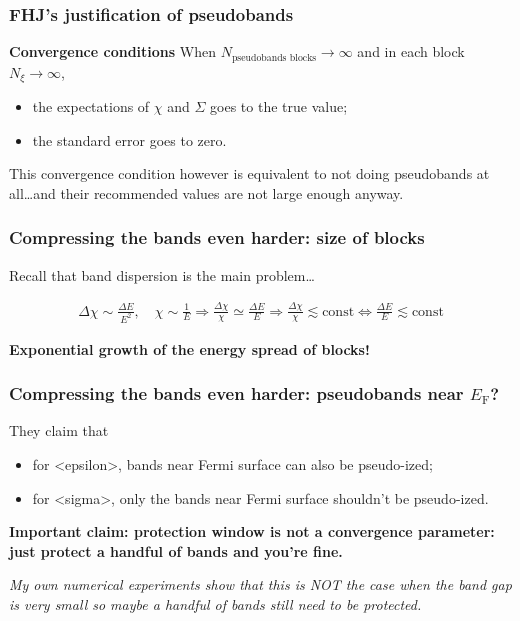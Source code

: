 \documentclass[t,aspectratio=169]{beamer}
\newcommand{\shortcode}[1]{\texttt{#1}}
\newcommand*{\const}{\text{const}}
\def\\{}%
\def\texttt#1{<#1>}%
\begin{document}
\begin{frame}
\frametitle{FHJ's justification of pseudobands}

\textbf{Convergence conditions} When $N_{\text{pseudobands blocks}} \to \infty$ and in each block $N_\xi \to \infty$, 
\begin{itemize}
    \item the expectations of $\chi$ and $\Sigma$ goes to the true value;
    \item the standard error goes to zero.
\end{itemize}

This convergence condition however is equivalent to not doing pseudobands at all\dots and their recommended values are not large enough anyway.


\end{frame}

\begin{frame}
\frametitle{Compressing the bands even harder: size of blocks}

Recall that band dispersion is the main problem\dots

\[
    \begin{aligned}
        \Delta \chi \sim \frac{\Delta E}{E^2}, \quad \chi \sim \frac{1}{E} \Rightarrow
        \frac{\Delta \chi}{\chi} \simeq \frac{\Delta E}{E} \\
        \Rightarrow
        \frac{\Delta \chi}{\chi} \lesssim \const \Leftrightarrow \boxed{\frac{\Delta E}{E} \lesssim \const}
    \end{aligned}
\]

\textbf{Exponential growth of the energy spread of blocks!}

\end{frame}

\begin{frame}
\frametitle{Compressing the bands even harder: pseudobands near $E_{\text{F}}$?}

They claim that 
\begin{itemize}
    \item for \shortcode{epsilon}, bands near Fermi surface can also be pseudo-ized;
    \item for \shortcode{sigma}, only the bands near Fermi surface shouldn't be pseudo-ized.
\end{itemize}

\textbf{Important claim: protection window is not a convergence parameter: just protect a handful of bands and you're fine.} 


\emph{My own numerical experiments show that this is NOT the case when the band gap is very small so maybe a handful of bands still need to be protected.}

\end{frame}
\end{document}
